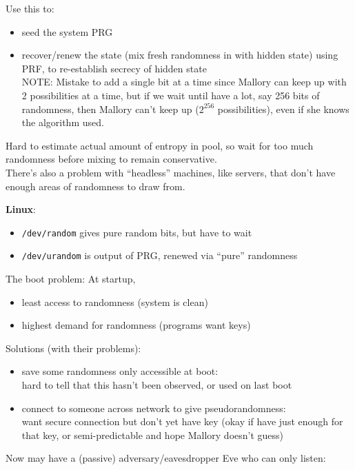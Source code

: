  Use this to:
\begin{itemize}
    \item seed the system PRG
    \item recover/renew the state (mix fresh randomness in with hidden state) using PRF,
        to re-establish secrecy of hidden state\\

        NOTE: Mistake to add a single bit at a time since Mallory can keep
        up with 2 possibilities at a time, but if we wait until have a
        lot, say 256 bits of randomness, then Mallory can't keep up ($2^{256}$
        possibilities), even if she knows the algorithm used.
\end{itemize}

Hard to estimate actual amount of entropy in pool, so wait for too
much randomness before mixing to remain conservative.\\
There's also a problem with ``headless'' machines, like servers, that don't have
enough areas of randomness to draw from.

{\bf Linux}:
\begin{itemize}
    \item {\tt /dev/random} gives pure random bits, but have to wait
    \item {\tt /dev/urandom} is output of PRG, renewed via ``pure'' randomness
\end{itemize}

The boot problem: At startup,
\begin{itemize}
    \item least access to randomness (system is clean)
    \item highest demand for randomness (programs want keys)
\end{itemize}

Solutions (with their problems):
\begin{itemize}
    \item save some randomness only accessible at boot:\\
        hard to tell that this hasn't been observed, or used on last boot
    \item connect to someone across network to give pseudorandomness:\\
        want secure connection but don't yet have key (okay if have just enough
        for that key, or semi-predictable and hope Mallory doesn't guess)
\end{itemize}

Now may have a (passive) adversary/eavesdropper Eve who can only listen:\\
\\
\makebox[5cm]{$\downarrow$}\\
\\

